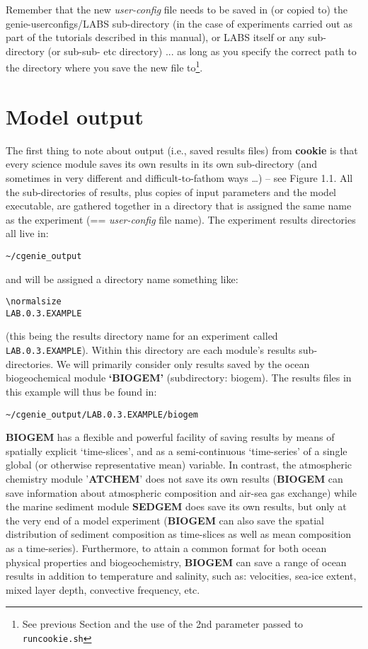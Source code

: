\noindent Remember that the new \textit{user-config} file needs to be saved in (or copied to) the \textsf{\footnotesize genie-userconfigs/LABS} sub-directory (in the case of experiments carried out as part of the tutorials described in this manual), or \textsf{\footnotesize LABS} itself or any sub-directory (or sub-sub- etc directory) ... as long as you specify the correct path to the directory where you save the new file to\footnote{See previous Section and the use of the 2nd parameter passed to \texttt{runcookie.sh}}.

\newpage

\section{Model output}

The first thing to note about output (i.e., saved results files) from \textbf{cookie} is that every science module saves its own results in its own sub-directory (and sometimes in very different and difficult-to-fathom ways …) – see Figure 1.1. All the sub-directories of results, plus copies of input parameters and the model executable, are gathered together in a directory that is assigned the same name as the experiment (== \textit{user-config} file name). The experiment results directories all live in:
\small\begin{verbatim}
~/cgenie_output
\end{verbatim}
and will be assigned a directory name something like:
\small\begin{verbatim}\normalsize
LAB.0.3.EXAMPLE
\end{verbatim}\normalsize
(this being the results directory name for an experiment called \texttt{LAB.0.3.EXAMPLE}). Within this directory are each module’s results sub-directories.
We will primarily consider only results saved by the ocean biogeochemical module \textbf{‘BIOGEM’} (subdirectory: \small\textsf{biogem}\normalsize). The results files in this example will thus be found in:
\small\begin{verbatim}
~/cgenie_output/LAB.0.3.EXAMPLE/biogem
\end{verbatim}\normalsize
\textbf{BIOGEM} has a flexible and powerful facility of saving results by means of spatially explicit ‘time-slices’, and as a semi-continuous ‘time-series’ of a single global (or otherwise representative mean) variable. In contrast, the atmospheric chemistry module '\textbf{ATCHEM}' does not save its own results (\textbf{BIOGEM} can save information about atmospheric composition and air-sea gas exchange) while the marine sediment module \textbf{SEDGEM} does save its own results, but only at the very end of a model experiment (\textbf{BIOGEM} can also save the spatial distribution of sediment composition as time-slices as well as mean composition as a time-series). Furthermore, to attain a common format for both ocean physical properties and biogeochemistry, \textbf{BIOGEM} can save a range of ocean results in addition to temperature and salinity, such as: velocities, sea-ice extent, mixed layer depth, convective frequency, etc.

